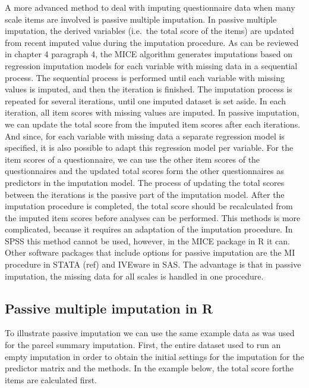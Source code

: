\documentclass[
]{book}
\begin{document}
A more advanced method to deal with imputing questionnaire data when many scale items are involved is passive multiple imputation. In passive multiple imputation, the derived variables (i.e.~the total score of the items) are updated from recent imputed value during the imputation procedure. As can be reviewed in chapter 4 paragraph 4, the MICE algorithm generates imputations based on regression imputation models for each variable with missing data in a sequential process. The sequential process is performed until each variable with missing values is imputed, and then the iteration is finished. The imputation process is repeated for several iterations, until one imputed dataset is set aside. In each iteration, all item scores with missing values are imputed. In passive imputation, we can update the total score from the imputed item scores after each iterations. And since, for each variable with missing data a separate regression model is specified, it is also possible to adapt this regression model per variable. For the item scores of a questionnaire, we can use the other item scores of the questionnaires and the updated total scores form the other questionnaires as predictors in the imputation model. The process of updating the total scores between the iterations is the passive part of the imputation model. After the imputation procedure is completed, the total score should be recalculated from the imputed item scores before analyses can be performed.
This methods is more complicated, because it requires an adaptation of the imputation procedure. In SPSS this method cannot be used, however, in the MICE package in R it can. Other software packages that include options for passive imputation are the MI procedure in STATA (ref) and IVEware in SAS. The advantage is that in passive imputation, the missing data for all scales is handled in one procedure.

\hypertarget{passive-multiple-imputation-in-r}{%
\subsection{Passive multiple imputation in R}\label{passive-multiple-imputation-in-r}}

To illustrate passive imputation we can use the same example data as was used for the parcel summary imputation. First, the entire dataset used to run an empty imputation in order to obtain the initial settings for the imputation for the predictor matrix and the methods. In the example below, the total score forthe items are calculated first.
\end{document}
